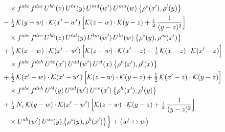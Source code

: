 \documentclass[10pt]{article}
\numberwithin{equation}{section}
\newcommand{\KK}{\mathcal K}
\begin{document}
\begin{align}
&\qquad\times f^{abc}\,f^{dce}\,U^{bh}(z)\,U^{hl}(y)\,U^{md}(w')\,U^{ma}(w)\,\big\{\rho^{e}(x'),\rho^{l}(y)\big\}\notag\\
&\quad -\tfrac12\,\KK(y-w)\cdot\KK(x'-w')\,\Big[\KK(z-w)\cdot\KK(y-z)+\tfrac12\,\frac{1}{(y-z)^2}\Big]\notag\\
&\qquad\times f^{abc}\,f^{dce}\,U^{bh}(z)\,U^{hd}(y)\,U^{lm}(w')\,U^{la}(w)\,\big\{\rho^{e}(y),\rho^{m}(x')\big\}\notag\\
&\quad +\tfrac12\,\KK(x-w)\cdot\KK(x'-w')\,\Big[\KK(z-w)\cdot\KK(x'-z)+\tfrac12\,\KK(x-z)\cdot\KK(x'-z)\Big]\notag\\
&\qquad\times f^{abc}\,f^{deh}\,U^{be}(x')\,U^{ad}(w')\,U^{cl}(x)\,\big\{\rho^{h}(x'),\rho^{l}(x)\big\}\notag\\
&\quad +\tfrac12\,\KK(x'-w)\cdot\KK(x'-w')\,\Big[\KK(z-w)\cdot\KK(y-z)+\tfrac12\,\KK(x'-z)\cdot\KK(y-z)\Big]\notag\\
&\qquad\times f^{abc}\,f^{deh}\,U^{bl}(y)\,U^{ad}(w')\,U^{ce}(x')\,\big\{\rho^{h}(x'),\rho^{l}(y)\big\}\notag\\
&\quad +\tfrac12\,N_{c}\,\KK(y-w)\cdot\KK(x'-w')\,\Big[\KK(z-w)\cdot\KK(y-z)+\tfrac12\,\frac{1}{(y-z)^2}\Big]\notag\\
&\qquad\times U^{ab}(w')\,U^{ac}(y)\,\big\{\rho^{c}(y),\rho^{b}(x')\big\}\Big\}+\big(w'\leftrightarrow w\big)\label{R:eq:sum-GIII.I}
\end{align}
\end{document}

